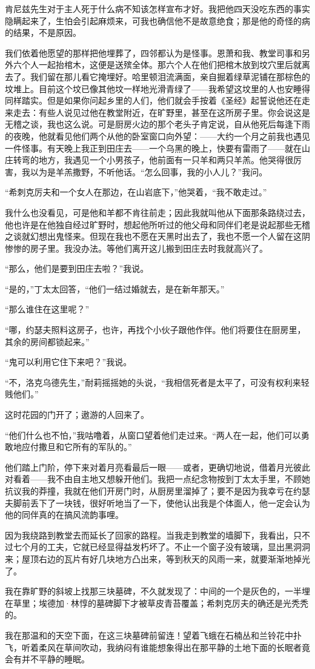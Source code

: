 \par 肯尼兹先生对于主人死于什么病不知该怎样宣布才好。我把他四天没吃东西的事实隐瞒起来了，生怕会引起麻烦来，可我也确信他不是故意绝食；那是他的奇怪的病的结果，不是原因。
\par 我们依着他愿望的那样把他埋葬了，四邻都认为是怪事。恩萧和我、教堂司事和另外六个人一起抬棺木，这便是送殡全体。那六个人在他们把棺木放到坟穴里后就离去了。我们留在那儿看它掩埋好。哈里顿泪流满面，亲自掘着绿草泥铺在那棕色的坟堆上。目前这个坟已像其他坟一样地光滑青绿了——我希望这坟里的人也安睡得同样踏实。但是如果你问起乡里的人们，他们就会手按着《圣经》起誓说他还在走来走去：有些人说见过他在教堂附近，在旷野里，甚至在这所房子里。你会说这是无稽之谈，我也这么说。可是厨房火边的那个老头子肯定说，自从他死后每逢下雨的夜晚，他就看见他们两个从他的卧室窗口向外望：——大约一个月之前我也遇见一件怪事。有天晚上我正到田庄去——一个乌黑的晚上，快要有雷雨了——就在山庄转弯的地方，我遇见一个小男孩子，他前面有一只羊和两只羊羔。他哭得很厉害，我以为是羊羔撒野，不听他话。“怎么回事，我的小人儿？”我问。
\par “希刺克厉夫和一个女人在那边，在山岩底下，”他哭着，“我不敢走过。”
\par 我什么也没看见，可是他和羊都不肯往前走；因此我就叫他从下面那条路绕过去，他也许是在他独自经过旷野时，想起他所听过的他父母和同伴们老是说起那些无稽之谈就幻想出鬼怪来。但现在我也不愿在天黑时出去了，我也不愿一个人留在这阴惨惨的房子里。我没办法。等他们离开这儿搬到田庄去时我就高兴了。
\par “那么，他们是要到田庄去啦？”我说。
\par “是的，”丁太太回答，“他们一结过婚就去，是在新年那天。”
\par “那么谁住在这里呢？”
\par “哪，约瑟夫照料这房子，也许，再找个小伙子跟他作伴。他们将要住在厨房里，其余的房间都锁起来。”
\par “鬼可以利用它住下来吧？”我说。
\par “不，洛克乌德先生，”耐莉摇摇她的头说，“我相信死者是太平了，可没有权利来轻贱他们。”
\par 这时花园的门开了；遨游的人回来了。
\par “他们什么也不怕，”我咕噜着，从窗口望着他们走过来。“两人在一起，他们可以勇敢地应付撒旦和它所有的军队的。”
\par 他们踏上门阶，停下来对着月亮看最后一眼——或者，更确切地说，借着月光彼此对看着——我不由自主地又想躲开他们。我把一点纪念物按到丁太太手里，不顾她抗议我的莽撞，我就在他们开房门时，从厨房里溜掉了；要不是因为我幸亏在约瑟夫脚前丢下了一块钱，很好听地当了一下，使他认出我是个体面人，他一定会认为他的同伴真的在搞风流韵事哩。
\par 因为我绕路到教堂去而延长了回家的路程。当我走到教堂的墙脚下，我看出，只不过七个月的工夫，它就已经显得益发朽坏了。不止一个窗子没有玻璃，显出黑洞洞来；屋顶右边的瓦片有好几块地方凸出来，等到秋天的风雨一来，就要渐渐地掉光了。
\par 我在靠旷野的斜坡上找那三块墓碑，不久就发现了：中间的一个是灰色的，一半埋在草里；埃德加·林惇的墓碑脚下才被草皮青苔覆盖；希刺克厉夫的确还是光秃秃的。
\par 我在那温和的天空下面，在这三块墓碑前留连！望着飞蛾在石楠丛和兰铃花中扑飞，听着柔风在草间吹动，我纳闷有谁能想象得出在那平静的土地下面的长眠者竟会有并不平静的睡眠。


